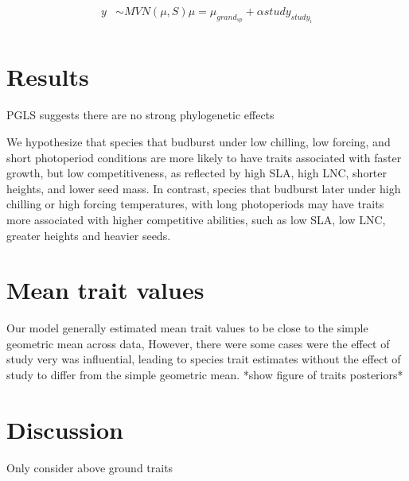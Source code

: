 \documentclass{article}\usepackage[]{graphicx}\usepackage[]{color}
\begin{document}
\begin{align*}
y & \sim MVN(\mu, S)
\mu = \mu_{grand_{sp}} + \alpha study_{study_i} \\
\end{align*}

\section{Results}
PGLS suggests there are no strong phylogenetic effects

 We hypothesize that species that budburst under low chilling, low forcing, and short photoperiod conditions are more likely to have traits associated with faster growth, but low competitiveness, as reflected by high SLA, high LNC, shorter heights, and lower seed mass. In contrast, species that budburst later under high chilling or high forcing temperatures, with long photoperiods  may have traits more associated with higher competitive abilities, such as low SLA, low LNC, greater heights and heavier seeds. 

\section{Mean trait values}
Our model generally estimated mean trait values to be close to the simple geometric mean across data, However, there were some cases were the effect of study very was influential, leading to species trait estimates without the effect of study to differ from the simple geometric mean. *show figure of traits posteriors*  
 
\section{Discussion}

Only consider above ground traits

\pagebreak
% 

\end{document}
